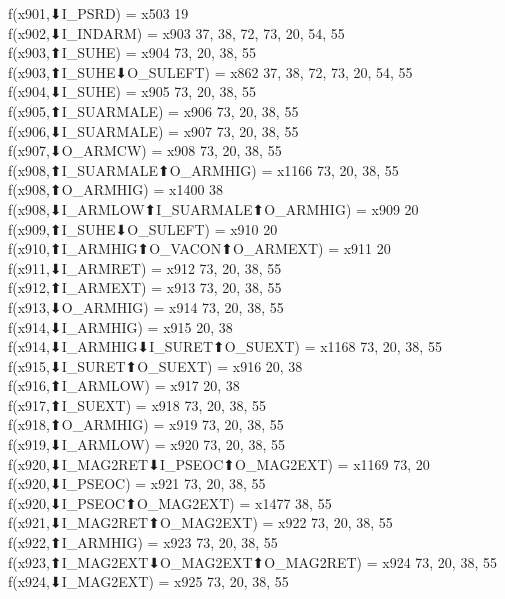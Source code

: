f(x901,⬇I_PSRD) = x503 {19} \\
f(x902,⬇I_INDARM) = x903 {37, 38, 72, 73, 20, 54, 55} \\
f(x903,⬆I_SUHE) = x904 {73, 20, 38, 55} \\
f(x903,⬆I_SUHE⬇O_SULEFT) = x862 {37, 38, 72, 73, 20, 54, 55} \\
f(x904,⬇I_SUHE) = x905 {73, 20, 38, 55} \\
f(x905,⬆I_SUARMALE) = x906 {73, 20, 38, 55} \\
f(x906,⬇I_SUARMALE) = x907 {73, 20, 38, 55} \\
f(x907,⬇O_ARMCW) = x908 {73, 20, 38, 55} \\
f(x908,⬆I_SUARMALE⬆O_ARMHIG) = x1166 {73, 20, 38, 55} \\
f(x908,⬆O_ARMHIG) = x1400 {38} \\
f(x908,⬇I_ARMLOW⬆I_SUARMALE⬆O_ARMHIG) = x909 {20} \\
f(x909,⬆I_SUHE⬇O_SULEFT) = x910 {20} \\
f(x910,⬆I_ARMHIG⬆O_VACON⬆O_ARMEXT) = x911 {20} \\
f(x911,⬇I_ARMRET) = x912 {73, 20, 38, 55} \\
f(x912,⬆I_ARMEXT) = x913 {73, 20, 38, 55} \\
f(x913,⬇O_ARMHIG) = x914 {73, 20, 38, 55} \\
f(x914,⬇I_ARMHIG) = x915 {20, 38} \\
f(x914,⬇I_ARMHIG⬇I_SURET⬆O_SUEXT) = x1168 {73, 20, 38, 55} \\
f(x915,⬇I_SURET⬆O_SUEXT) = x916 {20, 38} \\
f(x916,⬆I_ARMLOW) = x917 {20, 38} \\
f(x917,⬆I_SUEXT) = x918 {73, 20, 38, 55} \\
f(x918,⬆O_ARMHIG) = x919 {73, 20, 38, 55} \\
f(x919,⬇I_ARMLOW) = x920 {73, 20, 38, 55} \\
f(x920,⬇I_MAG2RET⬇I_PSEOC⬆O_MAG2EXT) = x1169 {73, 20} \\
f(x920,⬇I_PSEOC) = x921 {73, 20, 38, 55} \\
f(x920,⬇I_PSEOC⬆O_MAG2EXT) = x1477 {38, 55} \\
f(x921,⬇I_MAG2RET⬆O_MAG2EXT) = x922 {73, 20, 38, 55} \\
f(x922,⬆I_ARMHIG) = x923 {73, 20, 38, 55} \\
f(x923,⬆I_MAG2EXT⬇O_MAG2EXT⬆O_MAG2RET) = x924 {73, 20, 38, 55} \\
f(x924,⬇I_MAG2EXT) = x925 {73, 20, 38, 55} \\
